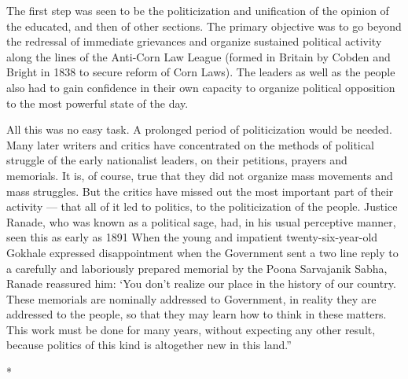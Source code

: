 The first step was seen to be the politicization and unification of the opinion of the educated, and then of other sections. The primary objective was to go beyond the redressal of immediate grievances and organize sustained political activity along the lines of the Anti-Corn Law League (formed in Britain by Cobden and Bright in 1838 to secure reform of Corn Laws). The leaders as well as the people also had to gain confidence in their own capacity to organize political opposition to the most powerful state of the day.

All this was no easy task. A prolonged period of politicization would be needed. Many later writers and critics have concentrated on the methods of political struggle of the early nationalist leaders, on their petitions, prayers and memorials. It is, of course, true that they did not organize mass movements and mass struggles. But the critics have missed out the most important part of their activity — that all of it led to politics, to the politicization of the people. Justice Ranade, who was known as a political sage, had, in his usual perceptive manner, seen this as early as 1891 When the young and impatient twenty-six-year-old Gokhale expressed disappointment when the Government sent a two line reply to a carefully and laboriously prepared memorial by the Poona Sarvajanik Sabha, Ranade reassured him: ‘You don’t realize our place in the history of our country. These memorials are nominally addressed to Government, in reality they are addressed to the people, so that they may learn how to think in these matters. This work must be done for many years, without expecting any other result, because politics of this kind is altogether new in this land.”

\begin{center}*\end{center}



